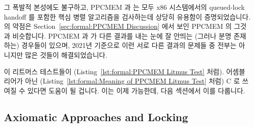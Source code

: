 \iffalse

Howeved, where PPCMEM requires 14 CPU hours to solve IRIW, \co{herd} does so
in 17 milliseconds, which represents a speedup of more than six orders
of magnitude.
That said, the problem is exponential in nature, so we should expect
\co{herd} to exhibit exponential slowdowns for larger problems.
And this is exactly what happens, for example, if we add four more writes
per writing CPU as shown in
Listing~\ref{lst:formal:Expanded IRIW Litmus Test},
\co{herd} slows down by a factor of more than 50,000, requiring more than
15 \emph{minutes} of CPU time.
Adding threads also results in exponential
slowdowns~\cite{PaulEMcKenney2014weakaxiom}.

\fi

그 폭발적 본성에도 불구하고, PPCMEM 과  는 모두 x86 시스템에서의
queued-lock handoff 를 포함한 핵심 병렬 알고리즘을 검사하는데 상당히 유용함이
증명되었습니다.
 의 약점은 Section~\ref{sec:formal:PPCMEM Discussion} 에서 보인 PPCMEM
의 그것과 비슷합니다.
PPCMEM 과  가 다른 결과를 내는 눈에 잘 안띄는 (그러나 분명 존재하는)
경우들이 있으며, 2021년 기준으로 이런 서로 다른 결과의 문제들 중 전부는
아니지만 많은 것들이 해결되었습니다.

이 리트머스 테스트들이
(Listing~\ref{lst:formal:PPCMEM Litmus Test} 처럼).
어셈블리어가 아닌
(Listing~\ref{lst:formal:Meaning of PPCMEM Litmus Test} 처럼)
C 로 쓰여질 수 있다면 도움이 될 겁니다.
이는 이제 가능한데, 다음 섹션에서 이를 다룹니다.

\iffalse

Despite their exponential nature, both PPCMEM and \co{herd} have proven quite
useful for checking key parallel algorithms, including the queued-lock
handoff on x86 systems.
The weaknesses of the \co{herd} tool are similar to those of PPCMEM, which
were described in
Section~\ref{sec:formal:PPCMEM Discussion}.
There are some obscure (but very real) cases for which the PPCMEM and
\co{herd} tools disagree, and as of 2021 many but not all of these disagreements
was resolved.

It would be helpful if the litmus tests could be written in C
(as in Listing~\ref{lst:formal:Meaning of PPCMEM Litmus Test})
rather than assembly
(as in Listing~\ref{lst:formal:PPCMEM Litmus Test}).
This is now possible, as will be described in the following sections.

\fi

\subsection{Axiomatic Approaches and Locking}
\label{sec:formal:Axiomatic Approaches and Locking}

